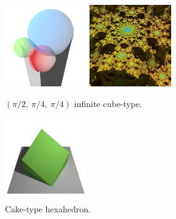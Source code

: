 \begin{figure}[htbp]
\begin{minipage}[t]{0.5\textwidth}
 \begin{minipage}[t]{0.24\textwidth}
  \centering
  \includegraphics[width=1.4in, height=1.4in, keepaspectratio]
  {./img/application/sphairahedron/variations/cube/prismType5.png}
 \end{minipage}
 \hspace*{\fill}
 \begin{minipage}[t]{0.24\textwidth}
  \centering
  \includegraphics[width=1.4in, height=1.4in, keepaspectratio]
  {./img/application/sphairahedron/variations/cube/limitType5.jpg}
 \end{minipage}
 \hspace*{\fill}
 \caption{$(\pi/2,~\pi/4,~\pi/4)$ infinite cube-type.}
 \label{fig:cube-244}
\end{minipage}
 \begin{minipage}[t]{0.5\textwidth}
  \centering
  \includegraphics[width=1.4in, height=1.4in, keepaspectratio]
  {./img/application/sphairahedron/variations/hexahedralCake2/base.png}
  \caption{Cake-type hexahedron.}
  \label{fig:cake-polyhedron}
 \end{minipage}
 \hspace*{\fill}
\end{figure}

